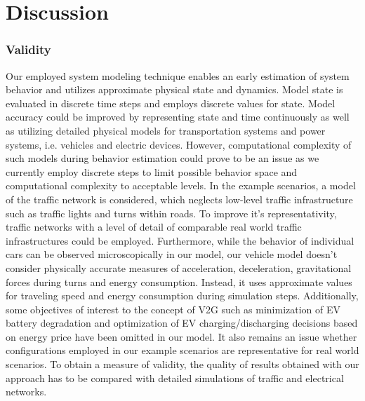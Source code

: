 \section{Discussion}
\label{section:discussion}
\subsubsection*{Validity}

Our employed system modeling technique enables an early estimation of system behavior and utilizes approximate physical state and dynamics. Model state is evaluated in discrete time steps and employs discrete values for state. Model accuracy could be improved by representing state and time continuously as well as utilizing detailed physical models for transportation systems and power systems, i.e. vehicles and electric devices. However, computational complexity of such models during behavior estimation could prove to be an issue as we currently employ discrete steps to limit possible behavior space and computational complexity to acceptable levels.
In the example scenarios, a model of the traffic network is considered, which neglects low-level traffic infrastructure such as traffic lights and turns within roads. To improve it's representativity, traffic networks with a level of detail of comparable real world traffic infrastructures could be employed. Furthermore, while the behavior of individual cars can be observed microscopically in our model, our vehicle model doesn't consider physically accurate measures of acceleration, deceleration, gravitational forces during turns and energy consumption. Instead, it uses approximate values for traveling speed and energy consumption during simulation steps. Additionally, some objectives of interest to the concept of V2G such as minimization of EV battery degradation and optimization of EV charging/discharging decisions based on energy price have been omitted in our model.
It also remains an issue whether configurations employed in our example scenarios are representative for real world scenarios. To obtain a measure of validity, the quality of results obtained with our approach has to be compared with detailed simulations of traffic and electrical networks.

